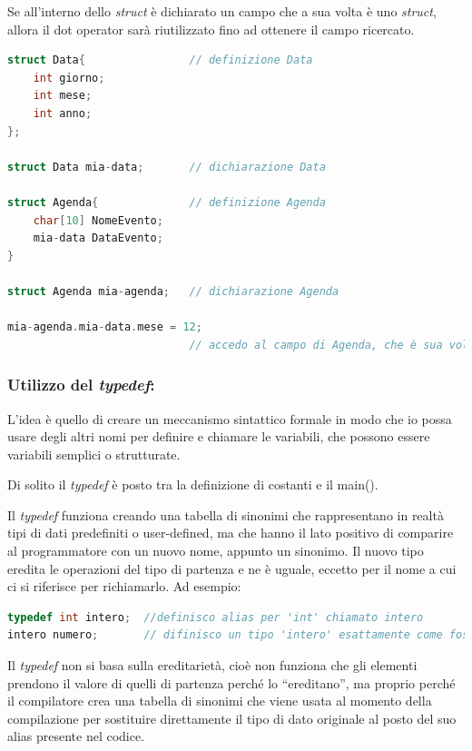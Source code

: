 \documentclass[
  paper=a4,
  oneside  ,captions=tableheading
]{scrbook}
\begin{document}
Se all'interno dello \emph{struct} è dichiarato un campo che a sua volta
è uno \emph{struct}, allora il dot operator sarà riutilizzato fino ad
ottenere il campo ricercato.

\begin{lstlisting}[language=C]
struct Data{                // definizione Data
    int giorno;
    int mese;
    int anno;
};

struct Data mia-data;       // dichiarazione Data

struct Agenda{              // definizione Agenda
    char[10] NomeEvento;
    mia-data DataEvento;
}

struct Agenda mia-agenda;   // dichiarazione Agenda

mia-agenda.mia-data.mese = 12;
                            // accedo al campo di Agenda, che è sua volta una variabile strutturata.
\end{lstlisting}

\hypertarget{utilizzo-del-typedef}{%
\subsubsection{\texorpdfstring{Utilizzo del
\emph{typedef}:}{Utilizzo del typedef:}}\label{utilizzo-del-typedef}}

L'idea è quello di creare un meccanismo sintattico formale in modo che
io possa usare degli altri nomi per definire e chiamare le variabili,
che possono essere variabili semplici o strutturate.

Di solito il \emph{typedef} è posto tra la definizione di costanti e il
main().

Il \emph{typedef} funziona creando una tabella di sinonimi che
rappresentano in realtà tipi di dati predefiniti o user-defined, ma che
hanno il lato positivo di comparire al programmatore con un nuovo nome,
appunto un sinonimo. Il nuovo tipo eredita le operazioni del tipo di
partenza e ne è uguale, eccetto per il nome a cui ci si riferisce per
richiamarlo. Ad esempio:

\begin{lstlisting}[language=C]
typedef int intero;  //definisco alias per 'int' chiamato intero
intero numero;       // difinisco un tipo 'intero' esattamente come fosse un qualsiasi altro tipo
\end{lstlisting}

Il \emph{typedef} non si basa sulla ereditarietà, cioè non funziona che
gli elementi prendono il valore di quelli di partenza perché lo
``ereditano'', ma proprio perché il compilatore crea una tabella di
sinonimi che viene usata al momento della compilazione per sostituire
direttamente il tipo di dato originale al posto del suo alias presente
nel codice.
\end{document}
